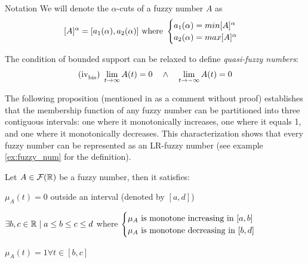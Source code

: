 \begin{notation}{Notation}
    We will denote the $\alpha$-cuts of a fuzzy number $A$ as 
    \[[A]^\alpha=[a_1(\alpha),a_2(\alpha)]\textnormal{ where }\begin{cases}
        a_1(\alpha)=min[A]^\alpha&\\
        a_2(\alpha)=max[A]^\alpha&\\
    \end{cases}\]
\end{notation}

\begin{note}
The condition of bounded support can be relaxed to define \textit{quasi-fuzzy numbers}:
$$\textnormal{(iv}_{\textnormal{bis}}\textnormal{) } \lim{t}{\infty}A(t) = 0 \quad \land \quad \lim{t}{-\infty}A(t) = 0$$
\end{note}

The following proposition (mentioned in \cite[p.~3]{FULLER2} as a comment without proof) establishes that the membership function of any fuzzy number can be partitioned into three contiguous intervals: one where it monotonically increases, one where it equals 1, and one where it monotonically decreases. This characterization shows that every fuzzy number can be represented as an LR-fuzzy number (see example \ref{ex:fuzzy_num} for the definition).

\begin{proposition}\label{prop:canonical_LR}
    Let $A\in \fuzzy{\R}$ be a fuzzy number, then it satisfies:
    \begin{romanenum}
        \item $\mu_A(t)=0$ outside an interval (denoted by $[a,d]$)\vspace{-0.5em}
        \item $\exists b,c \in \R \mid a\leq b \leq c \leq d$ where $\begin{cases}
            \mu_A\textnormal{ is monotone increasing in }[a,b]\\
            \mu_A\textnormal{ is monotone decreasing in }[b,d]\\
        \end{cases}$\vspace{-0.5em}
        \item $\mu_A(t)=1 \forall t\in [b,c]$
    \end{romanenum}
\end{proposition}


